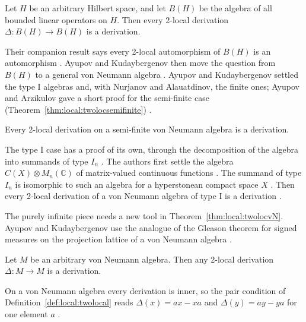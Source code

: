 \begin{theorem}\label{thm:local:twolocBH}
Let $H$ be an arbitrary Hilbert space, and let $B(H)$ be the algebra of all
bounded linear operators on $H$. Then every 2-local derivation
$\Delta\colon B(H)\to B(H)$ is a derivation.
\end{theorem}

Their companion result says every 2-local automorphism of $B(H)$ is an
automorphism \cite[Theorem~2.4, p.~17]{AyupovKudaybergenov2012}. Ayupov and
Kudaybergenov then move the question from $B(H)$ to a general von Neumann
algebra \cite[p.~9]{AyupovArzikulov2014}. Ayupov and Kudaybergenov settled
the type I algebras and, with Nurjanov and Alauatdinov, the finite ones;
Ayupov and Arzikulov gave a short proof for the semi-finite case (Theorem~\ref{thm:local:twolocsemifinite})
\cite[p.~9]{AyupovArzikulov2014}.\begin{theorem}\label{thm:local:twolocsemifinite}
Every 2-local derivation on a semi-finite von Neumann algebra is a
derivation.
\end{theorem}

The type I case has a proof of its own, through the decomposition of the
algebra into summands of type $I_n$ \cite[p.~1]{AyupovArzikulov2011TwoLocal}. The
authors first settle the algebra $C(X)\otimes M_n(\mathbb{C})$ of matrix-valued
continuous functions \cite[Theorem~1, p.~3]{AyupovArzikulov2011TwoLocal}. The
summand of type $I_n$ is isomorphic to such an algebra for a hyperstonean
compact space $X$ \cite[p.~7]{AyupovArzikulov2011TwoLocal}. Then every 2-local
derivation of a von Neumann algebra of type I is a derivation
\cite[Theorem~5, p.~7]{AyupovArzikulov2011TwoLocal}.

The purely infinite piece needs a new tool in
Theorem~\ref{thm:local:twolocvN}. Ayupov and Kudaybergenov
use the analogue of the Gleason theorem for signed measures on the
projection lattice of a von Neumann algebra
\cite[p.~1]{AyupovKudaybergenov2015}.

\begin{theorem}\label{thm:local:twolocvN}
Let $M$ be an arbitrary von Neumann algebra. Then any 2-local derivation
$\Delta\colon M\to M$ is a derivation.
\end{theorem}

On a von Neumann algebra every derivation is inner, so the pair condition
of Definition~\ref{def:local:twolocal} reads $\Delta(x)=ax-xa$ and
$\Delta(y)=ay-ya$ for one element $a$
\cite[p.~2]{AyupovKudaybergenov2015}.

